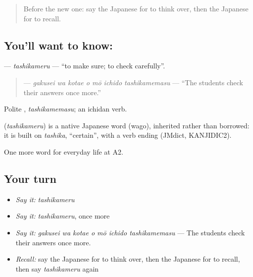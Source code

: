 \label{lesson:JA-C227-tashikameru}



\begin{quote}
Before the new one: say the Japanese for to think over, then the Japanese for to recall.
\end{quote}

\subsection*{You'll want to know: }
\textbf{} — \emph{tashikameru} — \textquotedblleft{}to make sure; to check carefully\textquotedblright{}.

\begin{quote}
\textbf{   } — \emph{gakusei wa kotae o mō ichido tashikamemasu} — \textquotedblleft{}The students check their answers once more.\textquotedblright{}
\end{quote}

Polite \textbf{}, \emph{tashikamemasu}; an ichidan verb.

\begin{cousinweb}
\textbf{} (\emph{tashikameru}) is a native Japanese word (wago), inherited rather than borrowed: it is built on \emph{tashika}, \textquotedblleft{}certain\textquotedblright{}, with a verb ending (JMdict, KANJIDIC2).
\end{cousinweb}

\begin{grammarlens}[title={What you've built}]
One more word for everyday life at A2.
\end{grammarlens}

\subsection*{Your turn}
\begin{itemize}
\raggedright
  \item \emph{Say it:} \emph{tashikameru}
  \item \emph{Say it:} \emph{tashikameru}, once more
  \item \emph{Say it:} \emph{gakusei wa kotae o mō ichido tashikamemasu} — The students check their answers once more.
  \item \emph{Recall:} say the Japanese for to think over, then the Japanese for to recall, then say \emph{tashikameru} again
\end{itemize}

